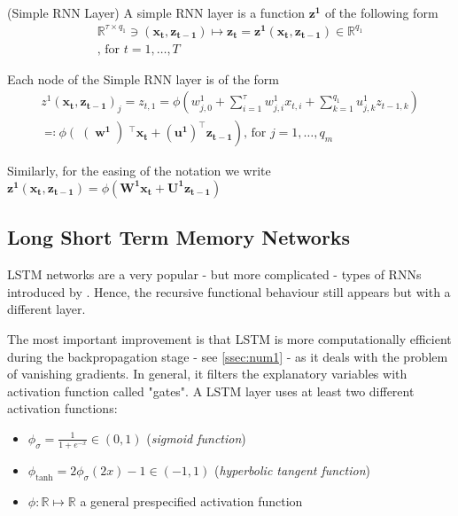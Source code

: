 \documentclass[a4paper, oneside]{discothesis}
\begin{document}
(Simple RNN Layer) A simple RNN layer is a function $\bm{z^1}$ of the following form
\begin{equation}
\begin{split}
\mathbb{R}^{\tau\times q_1} \ni (\bm{x_t}, \bm{z_{t-1}}) \longmapsto \bm{z_t} = \bm{z^1}(\bm{x_t}, \bm{z_{t-1}}) \in \mathbb{R}^{q_1} \\ \text{, for } t = 1, \dots, T
\end{split}
\end{equation}

Each node of the Simple RNN layer is of the form 
\begin{equation}
\begin{split}
z^1(\bm{x_t}, \bm{z_{t-1}})_j = z_{t,1} = \phi \left(w_{j,0}^1+\sum_{i=1}^{\tau}w_{j,i}^1x_{t,i}+\sum_{k = 1}^{q_1}u_{j,k}^1 z_{t-1, k}\right)\\\eqqcolon\phi\left(\right(\bm{w^1}\left) ^\intercal\bm{x_t}+\left(\bm{u^1}\right)^\intercal \bm{z_{t-1}}\right) \text{, for } j = 1, \dots, q_m
\end{split}
\end{equation}

Similarly, for the easing of the notation we write $\bm{z^1}(\bm{x_t}, \bm{z_{t-1}}) = \phi\left( \bm{W^1}\bm{x_t} + \bm{U^1}\bm{z_{t-1}}\right)$

\subsection{Long Short Term Memory Networks}
LSTM networks are a very popular - but more complicated - types of RNNs introduced by \cite{LSTM}. Hence, the recursive functional behaviour still appears but with a different layer. 

The most important improvement is that LSTM is more computationally efficient during the backpropagation stage - see \ref{ssec:num1} - as it deals with the problem of vanishing gradients. In general, it filters the explanatory variables with activation function called "gates". 
A LSTM layer uses at least two different activation functions:
\begin{itemize}
    \item $\phi_\sigma = \frac{1}{1+e^{-x}} \in (0,1)$ (\textit{sigmoid function})
    \item $\phi_{\text{tanh}} = 2\phi_\sigma(2x)-1 \in (-1,1)$ (\textit{hyperbolic tangent function})
    \item $\phi: \mathbb{R}\mapsto\mathbb{R}$ a general prespecified activation function
\end{itemize}
\end{document}
